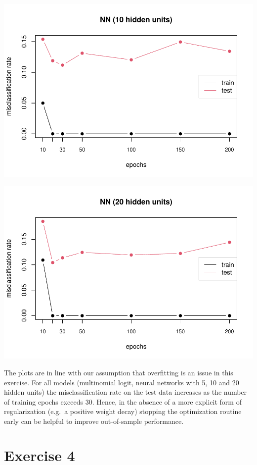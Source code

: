 \documentclass[
]{article}
\begin{document}
\includegraphics[width=0.9\linewidth]{A4_files/figure-latex/unnamed-chunk-15-1}

\includegraphics[width=0.9\linewidth]{A4_files/figure-latex/unnamed-chunk-16-1}

The plots are in line with our assumption that overfitting is an issue
in this exercise. For all models (multinomial logit, neural networks
with 5, 10 and 20 hidden units) the misclassification rate on the test
data increases as the number of training epochs exceeds 30. Hence, in
the absence of a more explicit form of regularization (e.g.~a positive
weight decay) stopping the optimization routine early can be helpful to
improve out-of-sample performance.

\newpage

\section{Exercise 4}\label{exercise-4}
\end{document}
